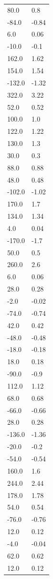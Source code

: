 \begin{longtable}{ll}
80.0 & 0.8 \\
-84.0 & -0.84 \\
6.0 & 0.06 \\
-10.0 & -0.1 \\
162.0 & 1.62 \\
154.0 & 1.54 \\
-132.0 & -1.32 \\
322.0 & 3.22 \\
52.0 & 0.52 \\
100.0 & 1.0 \\
122.0 & 1.22 \\
130.0 & 1.3 \\
30.0 & 0.3 \\
88.0 & 0.88 \\
48.0 & 0.48 \\
-102.0 & -1.02 \\
170.0 & 1.7 \\
134.0 & 1.34 \\
4.0 & 0.04 \\
-170.0 & -1.7 \\
50.0 & 0.5 \\
260.0 & 2.6 \\
6.0 & 0.06 \\
28.0 & 0.28 \\
-2.0 & -0.02 \\
-74.0 & -0.74 \\
42.0 & 0.42 \\
-48.0 & -0.48 \\
-18.0 & -0.18 \\
18.0 & 0.18 \\
-90.0 & -0.9 \\
112.0 & 1.12 \\
68.0 & 0.68 \\
-66.0 & -0.66 \\
28.0 & 0.28 \\
-136.0 & -1.36 \\
-20.0 & -0.2 \\
-54.0 & -0.54 \\
160.0 & 1.6 \\
244.0 & 2.44 \\
178.0 & 1.78 \\
54.0 & 0.54 \\
-76.0 & -0.76 \\
12.0 & 0.12 \\
-4.0 & -0.04 \\
62.0 & 0.62 \\
12.0 & 0.12 \\

\end{longtable}
